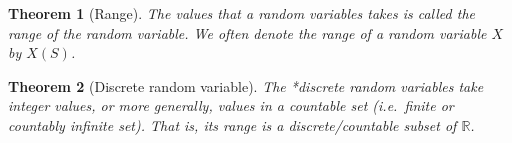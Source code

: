 \documentclass[
]{book}
\newtheorem{theorem}{Theorem}[chapter]
\theoremstyle{definition}
\theoremstyle{definition}
\theoremstyle{definition}
\theoremstyle{definition}
\theoremstyle{remark}
\begin{document}
\begin{theorem}[Range]
The values that a random variables takes is called the \emph{range} of the random variable. We often denote the range of a random variable \(X\) by \(X(S)\).
\end{theorem}

\begin{theorem}[Discrete random variable]
The *discrete random variables take integer values, or more generally, values in a countable set (i.e.~finite or countably infinite set). That is, its range is a discrete/countable subset of \(\mathbb{R}\).
\end{theorem}

  
\end{document}
